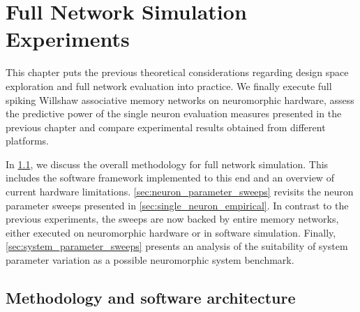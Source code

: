 \chapter{Full Network Simulation Experiments}
\label{chp:experiments}


This chapter puts the previous theoretical considerations regarding \BiNAM design space exploration and full network evaluation into practice. We finally execute full spiking Willshaw associative memory networks on neuromorphic hardware, assess the predictive power of the single neuron evaluation measures presented in the previous chapter and compare experimental results obtained from different platforms.

In \cref{sec:full_network_software_toolchain}, we discuss the overall methodology for full network simulation. This includes the software framework implemented to this end and an overview of current hardware limitations. \cref{sec:neuron_parameter_sweeps} revisits the neuron parameter sweeps presented in \cref{sec:single_neuron_empirical}. In contrast to the previous experiments, the sweeps are now backed by entire memory networks, either executed on neuromorphic hardware or in software simulation. Finally, \cref{sec:system_parameter_sweeps} presents an analysis of the suitability of \BiNAM system parameter variation as a possible neuromorphic system benchmark.

\section{Methodology and software architecture}
\label{sec:full_network_software_toolchain}

